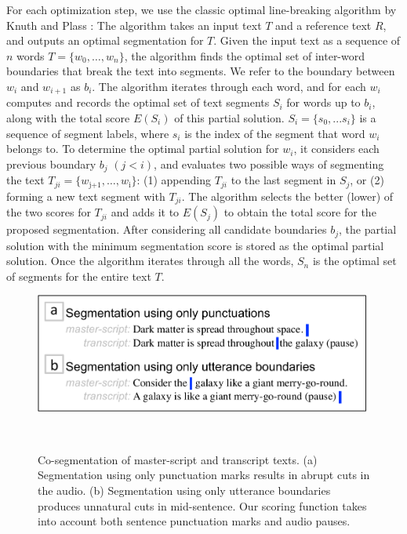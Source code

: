 For each optimization step, we use the classic optimal line-breaking algorithm by Knuth and Plass \cite{knuth1981breaking}: The algorithm takes an input text $T$ and a reference text $R$, and outputs an optimal segmentation for $T$. Given the input text as a sequence of $n$ words $T = \{w_0,\dots,w_n\}$, the algorithm finds the optimal set of inter-word
boundaries that break the text into segments. We refer to the boundary between $w_i$ and $w_{i+1}$ as $b_i$.
%
The algorithm iterates through each word, and for each $w_i$
computes and records the optimal set of text segments $S_i$ for words up to $b_i$, along with the total score $E(S_i)$ of
this partial solution. $S_i =\{s_0, ... s_i\}$ is a sequence of segment labels, where $s_i$ is the index of the segment that word $w_i$ belongs to. To determine the optimal partial solution for $w_i$, it
considers each previous boundary $b_j$ $(j<i)$, and evaluates two possible ways of
segmenting the text $T_{ji} = \{w_\text{j+1},
\dots,w_\text{i}\}$: (1) appending $T_{ji}$ to the last segment in $S_j$, or (2) forming a new text segment with $T_{ji}$. The algorithm selects the better (lower) of the two scores for $T_{ji}$ and adds it
to $E(S_j)$ to obtain the total score for the proposed
segmentation. After considering all candidate boundaries $b_j$, the partial solution with the minimum segmentation score is stored as the optimal partial solution. Once the algorithm iterates through all the words, $S_n$ is the
optimal set of segments for the entire text $T$. 

\begin{figure}
\centering
  \includegraphics[width=\textwidth]{figures/scoringfunc.pdf}
  \caption{Co-segmentation of master-script and transcript texts. (a) Segmentation using only punctuation marks results in abrupt cuts in the audio. (b) Segmentation using only utterance boundaries produces unnatural cuts in mid-sentence. Our scoring function takes into account both sentence punctuation marks and audio pauses.}~\label{fig:scoringfunc}
\end{figure}

